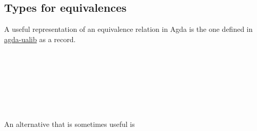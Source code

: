 \documentclass[sigplan,screen]{acmart}
\newcommand{\agdaualib}{\href{https://ualib.org}{agda-ualib}\xspace}
\newcommand{\agdaualib}{\href{anonymizedLink/agda-ualib.html}{agda-ualib}\xspace}
\begin{document}
\subsection{Types for equivalences}\label{types-for-equivalences}
A useful representation of an equivalence relation in Agda is the one defined in \agdaualib as a record.
\begin{code}\>[0]\AgdaSpace{}%
\AgdaSpace{}%
\>[10]\AgdaSymbol{\{}\AgdaSpace{}%
\AgdaSymbol{:}\AgdaSpace{}%
\AgdaSymbol{\}}\<%
\\
\>[10]\AgdaSymbol{\{}\AgdaSpace{}%
\AgdaSymbol{:}\AgdaSpace{}%
\AgdaSpace{}%
\AgdaSpace{}%
\AgdaSymbol{\}}\<%
\\
\>[10]\AgdaSymbol{(}\AgdaSpace{}%
\AgdaSymbol{:}\AgdaSpace{}%
\AgdaSpace{}%
\AgdaSpace{}%
\AgdaSymbol{)}\AgdaSpace{}%
\AgdaSymbol{:}\AgdaSpace{}%
\AgdaSpace{}%
\AgdaSpace{}%
\AgdaSpace{}%
\AgdaSpace{}%
\<%
\\
\>[0][@{}l@{\AgdaIndent{0}}]%
\>[2]\<%
\\
\>[2][@{}l@{\AgdaIndent{0}}]%
\>[4]%
\>[9]\AgdaSymbol{:}\AgdaSpace{}%
\AgdaSpace{}%
\<%
\\
%
\>[4]%
\>[10]\AgdaSymbol{:}\AgdaSpace{}%
\AgdaSpace{}%
\<%
\\
%
\>[4]\AgdaSpace{}%
\AgdaSymbol{:}\AgdaSpace{}%
\AgdaSpace{}%
\<%
\end{code}
An alternative that is sometimes useful is
\end{document}
